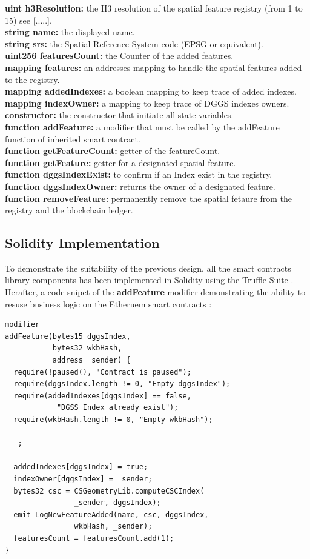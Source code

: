 \documentclass{isprs} %
\begin{document}
\textbf{uint h3Resolution:} the H3 resolution of the spatial feature registry (from 1 to 15) see [.....]. \\ 
\textbf{string name:} the displayed name. \\
\textbf{string srs:} the Spatial Reference System code (EPSG or equivalent). \\
\textbf{uint256 featuresCount:} the Counter of the added features. \\
\textbf{mapping features:} an addresses mapping to handle the spatial features added to the registry. \\
\textbf{mapping addedIndexes:} a boolean mapping to keep trace of added indexes. \\
\textbf{mapping indexOwner:} a mapping to keep trace of DGGS indexes owners. \\
\textbf{constructor:} the constructor that initiate all state variables. \\
\textbf{function addFeature:} a modifier that must be called by the addFeature function of inherited smart contract. \\
\textbf{function getFeatureCount:} getter of the featureCount. \\
\textbf{function getFeature:} getter for a designated spatial feature. \\
\textbf{function dggsIndexExist:} to confirm if an Index exist in the registry. \\
\textbf{function dggsIndexOwner:} returns the owner of a designated feature. \\
\textbf{function removeFeature:} permanently remove the spatial fetaure from the registry and the blockchain ledger.

\subsection{Solidity Implementation}\label{sec:Solidity Implementation}

To demonstrate the suitability of the previous design, all the smart contracts library components has been implemented in Solidity using the Truffle Suite \cite{truffle}. Herafter, a code snipet of the \textbf{addFeature} modifier demonstrating the ability to resuse business logic on the Etheruem smart contracts :

\begin{verbatim}
modifier 
addFeature(bytes15 dggsIndex, 
		   bytes32 wkbHash, 
		   address _sender) {
  require(!paused(), "Contract is paused");
  require(dggsIndex.length != 0, "Empty dggsIndex");
  require(addedIndexes[dggsIndex] == false, 
  			"DGSS Index already exist");
  require(wkbHash.length != 0, "Empty wkbHash");

  _;

  addedIndexes[dggsIndex] = true;
  indexOwner[dggsIndex] = _sender;
  bytes32 csc = CSGeometryLib.computeCSCIndex(
  				_sender, dggsIndex); 
  emit LogNewFeatureAdded(name, csc, dggsIndex, 
  				wkbHash, _sender);
  featuresCount = featuresCount.add(1);
}
\end{verbatim}
\end{document}
